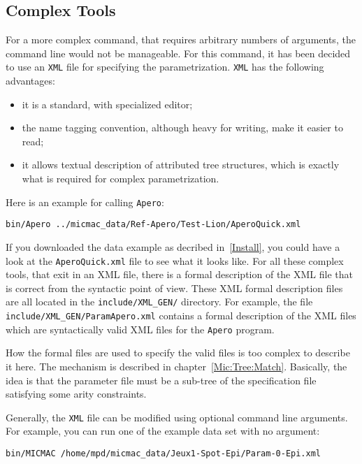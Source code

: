 \subsection{Complex Tools}

For a more complex command, that requires arbitrary numbers of arguments, the command line
would not be manageable. For this command, it has been decided to use an {\tt XML} file
for specifying the parametrization. {\tt XML} has the following advantages:


\begin{itemize}
    \item it is a standard, with  specialized editor;
    \item the name tagging convention, although heavy for writing, make it easier to read;
    \item it allows textual description of attributed tree structures, which is
          exactly what is required for complex parametrization.
\end{itemize}

Here is an example for calling {\tt Apero}: 

\begin{verbatim}
bin/Apero ../micmac_data/Ref-Apero/Test-Lion/AperoQuick.xml
\end{verbatim}

If you downloaded the data example as decribed in~\ref{Install}, you could have
a look at the {\tt AperoQuick.xml} file to see what it looks like. For all these
complex tools, that exit in an  XML file, there is a formal description of the 
XML file that is correct from the syntactic point of view. These XML formal description
files are all  located in the {\tt include/XML\_GEN/} directory.
For example, the file {\tt include/XML\_GEN/ParamApero.xml} contains a formal
description of the XML files which are syntactically valid XML files for the 
{\tt Apero} program.

How the formal files are used to specify the valid files is too complex
to describe it here. The mechanism is described in chapter~\ref{Mic:Tree:Match}.
Basically, the idea is that the parameter file
must be a sub-tree of the specification file satisfying some arity
constraints.


Generally, the {\tt XML} file can be modified using optional command line
arguments. For example, you can run one of the example data set with no
argument:

\begin{verbatim}
bin/MICMAC /home/mpd/micmac_data/Jeux1-Spot-Epi/Param-0-Epi.xml 
\end{verbatim}

